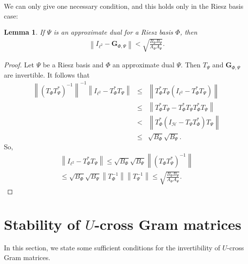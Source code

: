 \documentclass{birkjour}
\newtheorem{lem}[thm]{Lemma}
\theoremstyle{definition}
\theoremstyle{remark}
\numberwithin{equation}{section}
\begin{document}
We can only give one necessary condition, and this holds only in the Riesz basis case:
\begin{lem}  If $\Psi$ is  an  approximate dual for a Riesz basis $\Phi$, then
\begin{eqnarray*}
\left\|I_{\ell^2}-\mathbf{G}_{\Phi, \Psi}\right\|<\sqrt{\frac{B_{\Phi}B_{\Psi}}{A_{\Phi}A_{\Psi}}}.
\end{eqnarray*}
\end{lem}
\begin{proof}
   Let $\Psi$ be a Riesz basis and $\Phi$ an approximate dual $\Psi$. Then $T_{\Psi}$ and $\mathbf{G}_{\Phi,\Psi}$ are invertible. It follows that
\begin{eqnarray*}
\left\|(T_{\Phi}T_{\Psi}^*)^{-1}\right\|^{-1}\left\|I_{\ell^2}-T_{\Phi}^*T_{\Psi}\right\|&\leq& \left\|T_{\Phi}^*T_{\Psi}\left(I_{\ell^2}-T_{\Phi}^*T_{\Psi}\right)\right\|\\
&\leq&\left\|T_{\Phi}^*T_{\Psi}-T_{\Phi}^*T_{\Psi}T_{\Phi}^*T_{\Psi}\right\|\\
&<&\left\|T_{\Phi}^*\left(I_{\mathcal{H}}-T_{\Psi}T_{\Phi}^*\right)T_{\Psi} \right\|\\
&\leq& \sqrt{B_{\Phi}}\sqrt{B_{\Psi}}.
\end{eqnarray*}
So,
\begin{eqnarray*}
\left\|I_{\ell^2}-T_{\Phi}^*T_{\Psi}\right\|\leq \sqrt{B_{\Phi}}\sqrt{B_{\Psi}}\left\|(T_{\Phi}T_{\Psi}^*)^{-1}\right\|\\
\leq\sqrt{B_{\Phi}}\sqrt{B_{\Psi}}\left\|T_{\Phi}^{-1}\right\|\left\|T_{\Psi}^{-1}\right\|\leq \sqrt{\frac{B_{\Phi}B_{\Psi}}{A_{\Phi}A_{\Psi}}}.
\end{eqnarray*}
\end{proof}


 \section{Stability of $U$-cross Gram matrices} \label{sec:stability}
 In this section, we  state some sufficient  conditions for the invertibility of  $U$-cross Gram matrices.
\end{document}
